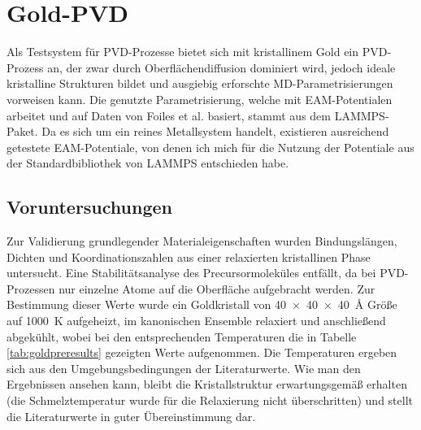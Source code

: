 \section{Gold-PVD}
\label{goldpvd}

Als Testsystem für PVD-Prozesse bietet sich mit kristallinem Gold ein PVD-Prozess an, der zwar durch Oberflächendiffusion dominiert wird, jedoch ideale kristalline Strukturen bildet und ausgiebig erforschte MD-Parametrisierungen vorweisen kann.
Die genutzte Parametrisierung, welche mit EAM-Potentialen arbeitet und auf Daten von Foiles et al.\cite{foiles_embedded-atom-method_1986} basiert, stammt aus dem LAMMPS-Paket.
Da es sich um ein reines Metallsystem handelt, existieren ausreichend getestete EAM-Potentiale, von denen ich mich für die Nutzung der Potentiale aus der Standardbibliothek von LAMMPS entschieden habe.

\subsection{Voruntersuchungen}

Zur Validierung grundlegender Materialeigenschaften wurden Bindungslängen, Dichten und Koordinationszahlen aus einer relaxierten kristallinen Phase untersucht.
Eine Stabilitätsanalyse des Precursormoleküles entfällt, da bei PVD-Prozessen nur einzelne Atome auf die Oberfläche aufgebracht werden.
Zur Bestimmung dieser Werte wurde ein Goldkristall von \SI{40x40x40}{\angstrom} Größe auf \SI{1000}{\kelvin} aufgeheizt, im kanonischen Ensemble relaxiert und anschließend abgekühlt, wobei bei den entsprechenden Temperaturen die in Tabelle \ref{tab:goldpreresults} gezeigten Werte aufgenommen.
Die Temperaturen ergeben sich aus den Umgebungsbedingungen der Literaturwerte.
Wie man den Ergebnissen ansehen kann, bleibt die Kristallstruktur erwartungsgemäß erhalten (die Schmelztemperatur wurde für die Relaxierung nicht überschritten) und stellt die Literaturwerte in guter Übereinstimmung dar.


